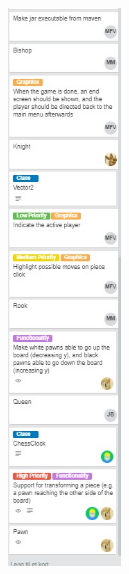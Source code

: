 \documentclass{article}
\begin{document}
\includegraphics[width=3cm]{programmingDone2.jpg}\\
\end{document}
